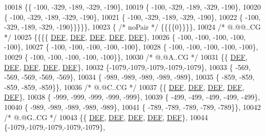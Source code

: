 \begin{DoxyCode}
10018 \{\{ -100, -329, -189, -329, -190\},
10019 \{ -100, -329, -189, -329, -190\},
10020 \{ -100, -329, -189, -329, -190\},
10021 \{ -100, -329, -189, -329, -190\},
10022 \{ -100, -329, -189, -329, -190\}\}\}\}\},
10023 \{ \textcolor{comment}{/* noPair */} \{\{\{\{0\}\}\}\},
10024 \textcolor{comment}{/*  @.@@..CG */}
10025 \{\{\{\{  \mbox{\hyperlink{1_88_84__epars_8h_a397419fc12b37ed479c8abb9d444d843}{DEF}},  \mbox{\hyperlink{1_88_84__epars_8h_a397419fc12b37ed479c8abb9d444d843}{DEF}},  \mbox{\hyperlink{1_88_84__epars_8h_a397419fc12b37ed479c8abb9d444d843}{DEF}},  \mbox{\hyperlink{1_88_84__epars_8h_a397419fc12b37ed479c8abb9d444d843}{DEF}},  \mbox{\hyperlink{1_88_84__epars_8h_a397419fc12b37ed479c8abb9d444d843}{DEF}}\},
10026 \{ -100, -100, -100, -100, -100\},
10027 \{ -100, -100, -100, -100, -100\},
10028 \{ -100, -100, -100, -100, -100\},
10029 \{ -100, -100, -100, -100, -100\}\},
10030 \textcolor{comment}{/*  @.@A..CG */}
10031 \{\{  \mbox{\hyperlink{1_88_84__epars_8h_a397419fc12b37ed479c8abb9d444d843}{DEF}},  \mbox{\hyperlink{1_88_84__epars_8h_a397419fc12b37ed479c8abb9d444d843}{DEF}},  \mbox{\hyperlink{1_88_84__epars_8h_a397419fc12b37ed479c8abb9d444d843}{DEF}},  \mbox{\hyperlink{1_88_84__epars_8h_a397419fc12b37ed479c8abb9d444d843}{DEF}},  \mbox{\hyperlink{1_88_84__epars_8h_a397419fc12b37ed479c8abb9d444d843}{DEF}}\},
10032 \{-1079,-1079,-1079,-1079,-1079\},
10033 \{ -569, -569, -569, -569, -569\},
10034 \{ -989, -989, -989, -989, -989\},
10035 \{ -859, -859, -859, -859, -859\}\},
10036 \textcolor{comment}{/*  @.@C..CG */}
10037 \{\{  \mbox{\hyperlink{1_88_84__epars_8h_a397419fc12b37ed479c8abb9d444d843}{DEF}},  \mbox{\hyperlink{1_88_84__epars_8h_a397419fc12b37ed479c8abb9d444d843}{DEF}},  \mbox{\hyperlink{1_88_84__epars_8h_a397419fc12b37ed479c8abb9d444d843}{DEF}},  \mbox{\hyperlink{1_88_84__epars_8h_a397419fc12b37ed479c8abb9d444d843}{DEF}},  \mbox{\hyperlink{1_88_84__epars_8h_a397419fc12b37ed479c8abb9d444d843}{DEF}}\},
10038 \{ -999, -999, -999, -999, -999\},
10039 \{ -499, -499, -499, -499, -499\},
10040 \{ -989, -989, -989, -989, -989\},
10041 \{ -789, -789, -789, -789, -789\}\},
10042 \textcolor{comment}{/*  @.@G..CG */}
10043 \{\{  \mbox{\hyperlink{1_88_84__epars_8h_a397419fc12b37ed479c8abb9d444d843}{DEF}},  \mbox{\hyperlink{1_88_84__epars_8h_a397419fc12b37ed479c8abb9d444d843}{DEF}},  \mbox{\hyperlink{1_88_84__epars_8h_a397419fc12b37ed479c8abb9d444d843}{DEF}},  \mbox{\hyperlink{1_88_84__epars_8h_a397419fc12b37ed479c8abb9d444d843}{DEF}},  \mbox{\hyperlink{1_88_84__epars_8h_a397419fc12b37ed479c8abb9d444d843}{DEF}}\},
10044 \{-1079,-1079,-1079,-1079,-1079\},

\end{DoxyCode}
